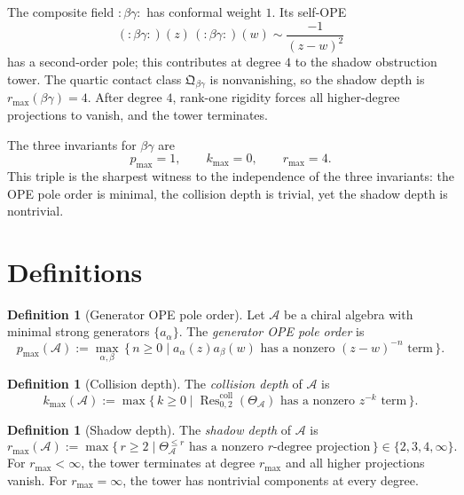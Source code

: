 \documentclass[11pt]{article}
\theoremstyle{definition}
\newtheorem{definition}[theorem]{Definition}
\theoremstyle{remark}
\newcommand{\cA}{\mathcal{A}}
\newcommand{\Res}{\operatorname{Res}}
\numberwithin{equation}{section}
\begin{document}
The composite field $:\!\beta\gamma\!:$ has conformal weight $1$. Its
self-OPE
\begin{equation}\label{eq:bg-composite-ope}
(:\!\beta\gamma\!:)(z)\,(:\!\beta\gamma\!:)(w)
\sim \frac{-1}{(z-w)^2}
\end{equation}
has a second-order pole; this contributes at degree $4$ to the shadow
obstruction tower. The quartic contact class
$\mathfrak{Q}_{\beta\gamma}$ is nonvanishing, so the shadow depth is
$r_{\max}(\beta\gamma) = 4$. After degree $4$, rank-one rigidity
forces all higher-degree projections to vanish, and the tower
terminates.

The three invariants for $\beta\gamma$ are
\[
p_{\max} = 1, \qquad k_{\max} = 0, \qquad r_{\max} = 4.
\]
This triple is the sharpest witness to the independence of the three
invariants: the OPE pole order is minimal, the collision depth is
trivial, yet the shadow depth is nontrivial.

\section{Definitions}\label{sec:defs}

\begin{definition}[Generator OPE pole order]\label{def:p-max}
Let $\cA$ be a chiral algebra with minimal strong generators
$\{a_\alpha\}$. The \emph{generator OPE pole order} is
\begin{equation}\label{eq:p-max-def}
p_{\max}(\cA)
:= \max_{\alpha,\beta}\,
\bigl\{\,n \geq 0 \;\big|\;
a_\alpha(z)a_\beta(w) \text{ has a nonzero }
(z-w)^{-n}\text{ term}\,\bigr\}.
\end{equation}
\end{definition}

\begin{definition}[Collision depth]\label{def:k-max}
The \emph{collision depth} of $\cA$ is
\begin{equation}\label{eq:k-max-def}
k_{\max}(\cA) := \max\bigl\{\,k \geq 0 \;\big|\;
\Res^{\mathrm{coll}}_{0,2}(\Theta_\cA)
\text{ has a nonzero } z^{-k}\text{ term}\,\bigr\}.
\end{equation}
\end{definition}

\begin{definition}[Shadow depth]\label{def:r-max}
The \emph{shadow depth} of $\cA$ is
\begin{equation}\label{eq:r-max-def}
r_{\max}(\cA) := \max\bigl\{\,r \geq 2 \;\big|\;
\Theta_\cA^{\leq r}
\text{ has a nonzero $r$-degree projection}\,\bigr\}
\in \{2,3,4,\infty\}.
\end{equation}
For $r_{\max} < \infty$, the tower terminates at degree $r_{\max}$ and
all higher projections vanish. For $r_{\max} = \infty$, the tower has
nontrivial components at every degree.
\end{definition}
\end{document}
